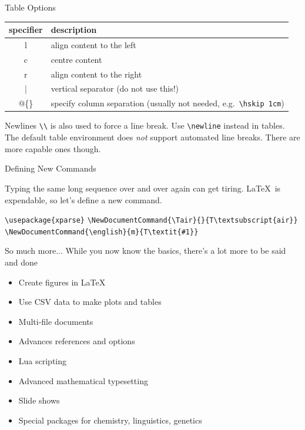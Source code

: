 \documentclass[final,aspectratio=43]{beamer}
\begin{document}
\begin{frame}[fragile]{Table Options}
    \begin{tabular}{cL{10cm}}
    specifier & description \\
    \hline
    l & align content to the left \\
    c & centre content \\
    r & align content to the right \\
    | & vertical separator (do not use this!) \\
    @\{\} & specify column separation (usually not needed, e.g.\ \texttt{\textbackslash hskip 1cm})\\
    \end{tabular}

    \begin{alertblock}{Newlines}
        \texttt{\textbackslash\textbackslash} is also used to force a line break. Use \texttt{\textbackslash newline} instead in tables. The default table environment does \emph{not} support automated line breaks. There are more capable ones though.
    \end{alertblock}
\end{frame}


\begin{frame}{Defining New Commands}

Typing the same long sequence over and over again can get tiring. \LaTeX\ is expendable, so let's define a new command.

\texttt{\textbackslash usepackage\{xparse\}}
\texttt{\textbackslash NewDocumentCommand\{\textbackslash Tair\}\{\}\{T\textbackslash textsubscript\{air\}\}}
\texttt{\textbackslash NewDocumentCommand\{\textbackslash english\}\{m\}\{T\textbackslash textit\{\#1\}\}}

\end{frame}

\begin{frame}{So much more...}
    While you now know the basics, there's a lot more to be said and done

    \begin{itemize}
        \item<+-> Create figures in \LaTeX
        \item<+-> Use CSV data to make plots and tables
        \item<+-> Multi-file documents
        \item<+-> Advances references and options
        \item<+-> Lua scripting
        \item<+-> Advanced mathematical typesetting
        \item<+-> Slide shows
        \item<+-> Special packages for chemistry, linguistics, genetics
    \end{itemize}
\end{frame}
\end{document}
